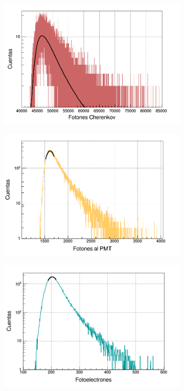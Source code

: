 \documentclass[12pt,oneside,openany,letter]{book}
\begin{document}
\begin{figure}
    \centering
    \begin{subfigure}{0.45\textwidth}
        \includegraphics[width=\textwidth]{images/cherenkov_total_mu.png}
        \caption{}
        \label{cherenkov_total_mu}
    \end{subfigure}
    \begin{subfigure}{0.45\textwidth}
        \includegraphics[width=\textwidth]{images/al_pmt_mu.png}
        \caption{}
        \label{al_pmt_mu}
    \end{subfigure}
    \begin{subfigure}{0.45\textwidth}
        \includegraphics[width=\textwidth]{images/fotoelectrones_vem.png}

\end{subfigure}
\end{figure}
\end{document}
